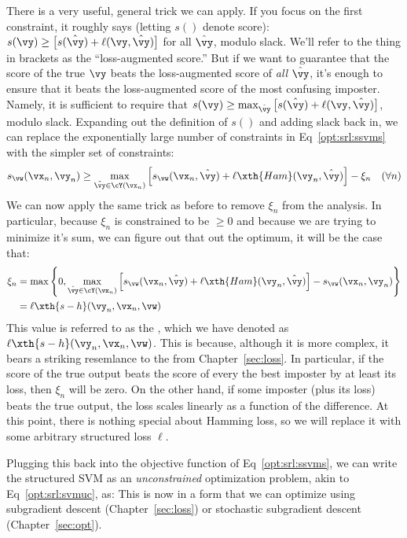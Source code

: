 There is a very useful, general trick we can apply.
If you focus on the first constraint, it roughly says (letting $s()$ denote score):
$s(\vy) \geq \big[ s(\hat\vy) + \ell(\vy,\hat\vy) \big]$ for all $\hat\vy$, modulo slack.
We'll refer to the thing in brackets as the ``loss-augmented score.''
But if we want to guarantee that the score of the true $\vy$ beats the loss-augmented score of \emph{all} $\hat\vy$, it's enough to ensure that it beats the loss-augmented score of the most confusing imposter.
Namely, it is sufficient to require that $s(\vy) \geq \max_{\hat\vy} \big[ s(\hat\vy) + \ell(\vy,\hat\vy) \big]$, modulo slack.
Expanding out the definition of $s()$ and adding slack back in, we can replace the exponentially large number of constraints in Eq~\eqref{opt:srl:ssvms} with the simpler set of constraints:
\begin{align}
   s_\vw(\vx_n,\vy_n) \geq
    \max_{\hat\vy \in \cY(\vx_n)} \Big[
    s_\vw(\vx_n, \hat\vy)
    + \ell\xth{Ham}(\vy_n, \hat\vy) \Big]
    - \xi_{n}\nonumber
 && (\forall n)
\end{align}
We can now apply the same trick as before to remove $\xi_n$ from the analysis.
In particular, because $\xi_n$ is constrained to be $\geq 0$ and because we are
trying to minimize it's sum, we can figure out that out the optimum, it will be the case that:
\begin{align}
  \xi_n &=
    \max \left\{ 0,
    \max_{\hat\vy \in \cY(\vx_n)} \Big[
          s_\vw(\vx_n,\hat\vy)
    + \ell\xth{Ham}(\vy_n, \hat\vy) \Big]
    - %
          s_\vw(\vx_n,\vy_n)
          \right\} \\
  &= \ell\xth{s-h}(\vy_n, \vx_n, \vw)
\end{align}
This value is referred to as
the , which we have denoted as $\ell\xth{s-h}(\vy_n, \vx_n, \vw)$.
This is because, although it is more complex, it bears a striking resemlance to the  from Chapter~\ref{sec:loss}.
In particular, if the score of the true output beats the score of every the best imposter by at least its loss, then $\xi_n$ will be zero.
On the other hand, if some imposter (plus its loss) beats the true output, the loss scales linearly as a function of the difference.
At this point, there is nothing special about Hamming loss, so we will replace it with some arbitrary structured loss $\ell$.

Plugging this back into the objective function of Eq~\eqref{opt:srl:ssvms}, we can write the structured SVM as an \emph{unconstrained} optimization problem, akin to Eq~\eqref{opt:srl:svmuc}, as:
%
%
This is now in a form that we can optimize using subgradient descent (Chapter~\ref{sec:loss}) or stochastic subgradient descent (Chapter~\ref{sec:opt}).

